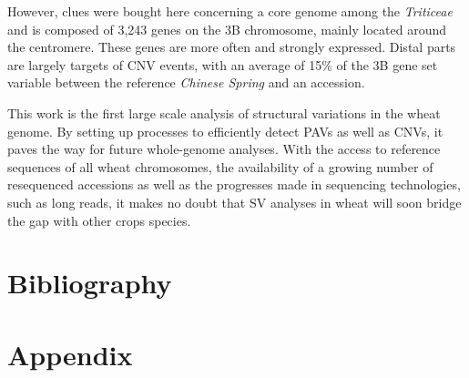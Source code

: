 \documentclass[a4paper, 12pt]{article}
\newenvironment{vcenterpage}
{\newpage\vspace*{\fill}}
{\vspace*{\fill}\par\pagebreak}
\begin{document}
\begin{onehalfspace}
However, clues were bought here concerning a core genome among the \textit{Triticeae} and is composed of 3,243 genes on the 3B chromosome, mainly located around the centromere. These genes are more often and strongly expressed. Distal parts are largely targets of CNV events, with an average of 15\% of the 3B gene set variable between the reference \textit{Chinese Spring} and an accession. 

This work is the first large scale analysis of structural variations in the wheat genome. By setting up processes to efficiently detect PAVs as well as CNVs, it paves the way for future whole-genome analyses. With the access to reference sequences of all wheat chromosomes, the availability of a growing number of resequenced accessions as well as the progresses made in sequencing technologies, such as long reads, it makes no doubt that SV analyses in wheat will soon bridge the gap with other crops species.

\end{onehalfspace}


\clearpage
\newpage
\pagestyle{empty}

    \part*{Bibliography}
    \renewcommand{\section}[2]{}   
    
    


\newpage
\pagestyle{empty}

\begin{vcenterpage}
\part*{Appendix}
\end{vcenterpage}
\end{document}
